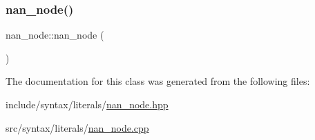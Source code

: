 \subsubsection{\texorpdfstring{nan\+\_\+node()}{nan\_node()}}
{\footnotesize\ttfamily nan\+\_\+node\+::nan\+\_\+node (\begin{DoxyParamCaption}{ }\end{DoxyParamCaption})}



The documentation for this class was generated from the following files\+:\begin{DoxyCompactItemize}
\item 
include/syntax/literals/\hyperlink{nan__node_8hpp}{nan\+\_\+node.\+hpp}\item 
src/syntax/literals/\hyperlink{nan__node_8cpp}{nan\+\_\+node.\+cpp}\end{DoxyCompactItemize}
